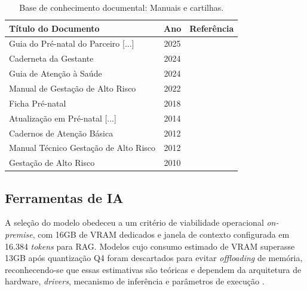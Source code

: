 \begin{table}[b!]
  \centering
  \caption{Base de conhecimento documental: Manuais e cartilhas.}
  \label{tab:cartilhas_sus}
  \begin{tabular}{l c c}
    \toprule
        \textbf{Título do Documento} & \textbf{Ano} & \textbf{Referência} \\ 
    \midrule
        Guia do Pré-natal do Parceiro [...]     & 2025 & \cite{GuiaPreNatalParceiro2025} \\
        Caderneta da Gestante                   & 2024 & \cite{CadernetaGestante2024} \\
        Guia de Atenção à Saúde                 & 2024 & \cite{GuiaAtencaoGestanteMG2024} \\
        Manual de Gestação de Alto Risco        & 2022 & \cite{ManualAltoRisco2022} \\
        Ficha Pré-natal                         & 2018 & \cite{FichaPreNatal2018} \\
        Atualização em Pré-natal [...]          & 2014 & \cite{AtualizacaoPreNatalSC2014} \\
        Cadernos de Atenção Básica              & 2012 & \cite{CadernosAtencaoBasica32} \\
        Manual Técnico Gestação de Alto Risco   & 2012 & \cite{ManualAltoRisco2012} \\
        Gestação de Alto Risco                  & 2010 & \cite{ManualAltoRisco2010} \\
    \bottomrule
  \end{tabular}
\end{table}

\subsection{Ferramentas de IA}

A seleção do modelo obedeceu a um critério de viabilidade operacional \textit{on-premise}, com 16GB de VRAM dedicados e janela de contexto configurada em 16.384 \textit{tokens} para RAG.
Modelos cujo consumo estimado de VRAM superasse 13GB após quantização Q4 foram descartados para evitar \textit{offloading} de memória, reconhecendo-se que essas estimativas são teóricas e dependem da arquitetura de hardware, \textit{drivers}, mecanismo de inferência e parâmetros de execução \cite{VRAMCalculator}.

